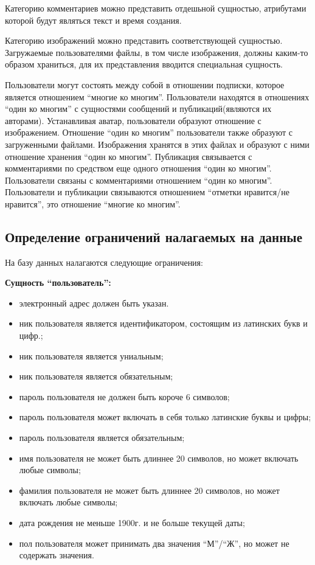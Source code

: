 Категорию комментариев можно представить отдешьной сущностью, атрибутами которой будут являться текст и время
создания.

Категорию изображений можно представить соответствующей сущностью.
Загружаемые пользователями файлы, в том числе изображения, должны каким-то образом храниться, для их
представления вводится специальная сущность.


Пользователи могут состоять между собой в отношении подписки, которое является отношением ``многие ко многим''.
Пользователи находятся в отношениях ``один ко многим'' с сущностями сообщений и публикаций(являются их авторами).
Устанавливая аватар, пользователи образуют отношение с изображением.
Отношение ``один ко многим'' пользователи также образуют с загруженными файлами.
Изображения хранятся в этих файлах и образуют с ними отношение хранения ``один ко многим''.
Публикация связывается с комментариями по средством еще одного отношения ``один ко многим''.
Пользователи связаны с комментариями отношением ``один ко многим''.
Пользователи и публикации связываются отношением ``отметки нравится/не нравится'',
это отношение ``многие ко многим''.
 

\subsection{Определение ограничений налагаемых на данные}

На базу данных налагаются следующие ограничения:

\textbf{Сущность ``пользователь'':}
\begin{itemize}
\item электронный адрес должен быть указан.
\item ник пользователя является идентификатором, состоящим из латинских букв и цифр.;
\item ник пользователя является униальным;
\item ник пользователя является обязательным;
\item пароль пользователя не должен быть короче 6 символов;
\item пароль пользователя может включать в себя только латинские буквы и цифры;
\item пароль пользователя является обязательным;
\item имя пользователя не может быть длиннее 20 символов, но может включать любые символы;
\item фамилия пользователя не может быть длиннее 20 символов, но может включать любые символы;
\item дата рождения не меньше 1900г. и не больше текущей даты;
\item пол пользователя может принимать два значения ``М''/``Ж'', но может не содержать значения.
\end{itemize}

